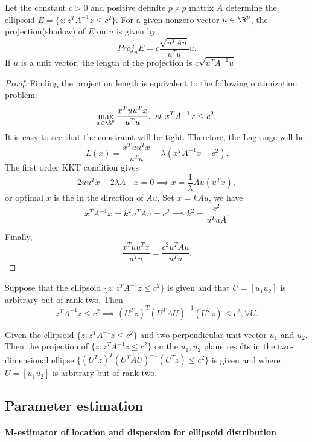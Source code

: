 \begin{refsection}
\begin{lemma}\cite[258]{johnson2007applied}
Let the constant $c > 0$ and positive definite $p\times p$ matrix $A$ determine the ellipsoid $E=\{z: z^T A^{-1} z \leq c^2\}$. For a given nonzero vector $u\in \R^p$, the projection(shadow) of $E$ on $u$ is given by
$$Proj_{u} E = c\frac{\sqrt{u^TAu}}{u^Tu}u.$$
If $u$ is a unit vector, the length of the projection is $c\sqrt{u^TA^{-1}u}$  
\end{lemma}
\begin{proof}
Finding the projection length is equivalent to the following optimization problem:
$$\max_{x\in\R^p} \frac{x^Tuu^Tx}{u^Tu}, ~st~ x^TA^{-1}x \leq c^2.$$
It is easy to see that the constraint will be tight. Therefore, the Lagrange will be $$L(x) = \frac{x^Tuu^Tx}{u^Tu} - \lambda(x^T A^{-1}x - c^2).$$
The first order KKT condition gives
$$2uu^T x - 2\lambda A^{-1}x = 0 \implies x = \frac{1}{\lambda} Au(u^T x), $$
or optimal $x$  is the in the direction of $Au$. Set $x = kAu$, we have
$$x^TA^{-1}x = k^2 u^T A u  = c^2 \implies k^2 = \frac{c^2}{u^TuA}.$$

Finally, $$\frac{x^Tuu^Tx}{u^Tu} = \frac{c^2 u^T A u}{u^T u}.$$ 
\end{proof}


\begin{lemma}\cite[259]{johnson2007applied}
Suppose that the ellipsoid $\{z: z^TA^{-1}z \leq c^2\}$ is given and that $U = [u_1 u_2]$ is arbitrary but of rank two. Then
$$z^T A^{-1} z \leq c^2 \implies (U^T z)^T(U^T A U)^{-1}(U^Tz)\leq c^2, \forall U.$$	
\end{lemma}



\begin{lemma}\cite[259]{johnson2007applied}
	Given the ellipsoid $\{z: z^TA^{-1}z \leq c^2\}$ and two perpendicular unit vector $u_1$ and $u_2$. Then the projection of $\{z:z^TA^{-1}z\leq c^2\}$ on the $u_1,u_2$ plane results in the two-dimensional ellipse $\{(U^T z)^T(U^T A U)^{-1}(U^Tz)\leq c^2 \}$ is given and where $U = [u_1 u_2]$ is arbitrary but of rank two.
\end{lemma}

\subsection{Parameter estimation}


\paragraph{M-estimator of location and dispersion for ellipsoid distribution}


\end{refsection}
